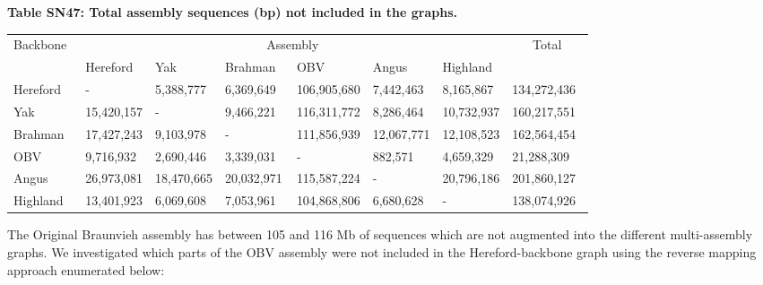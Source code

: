 \documentclass[../main.tex]{subfiles}
\begin{document}
\begin{flushleft}
\bigskip

\textbf{\hypertarget{Table SN47}{Table SN47}: Total assembly sequences (bp) not included in the graphs.}
\begin{center}
    \centering
    \footnotesize
    \begin{tabular}{|l|l|l|l|l|l|l|l|} 
    \hline
    \multicolumn{1}{|c|}{\multirow{2}{*}{Backbone~}} & \multicolumn{6}{c|}{Assembly}                                                & \multicolumn{1}{c|}{\multirow{2}{*}{Total}}  \\ 
    \cline{2-7}
    \multicolumn{1}{|c|}{}                            & Hereford~  & Yak        & Brahman ~  & OBV         & Angus      & Highland   & \multicolumn{1}{c|}{}                        \\ 
    \hline
    Hereford                                          & -          & 5,388,777  & 6,369,649  & 106,905,680 & 7,442,463  & 8,165,867  & 134,272,436~                                 \\ 
    \hline
    Yak                                               & 15,420,157 & -          & 9,466,221  & 116,311,772 & 8,286,464  & 10,732,937 & 160,217,551~                                 \\ 
    \hline
    Brahman~                                          & 17,427,243 & 9,103,978  & -          & 111,856,939 & 12,067,771 & 12,108,523 & 162,564,454~                                 \\ 
    \hline
    OBV                                               & 9,716,932  & 2,690,446  & 3,339,031  & -           & 882,571    & 4,659,329  & 21,288,309~                                  \\ 
    \hline
    Angus                                             & 26,973,081 & 18,470,665 & 20,032,971 & 115,587,224 & -          & 20,796,186 & 201,860,127~                                 \\ 
    \hline
    Highland                                          & 13,401,923 & 6,069,608  & 7,053,961  & 104,868,806 & 6,680,628  & -          & 138,074,926~                                 \\
    \hline
    \end{tabular}
\end{center}

\bigskip

The Original Braunvieh assembly has between 105 and 116 Mb of sequences which are not augmented into the different multi-assembly graphs. We investigated which parts of the OBV assembly were not included in the Hereford-backbone graph using the reverse mapping approach enumerated below:


\end{flushleft}
\end{document}
